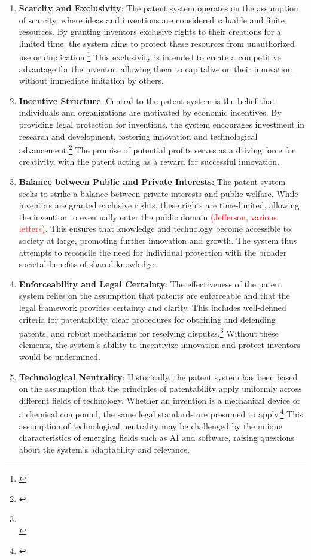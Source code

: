 \documentclass{article}[10pt]
\begin{document}
\begin{enumerate}
    \item \textbf{Scarcity and Exclusivity}: 
    The patent system operates on the assumption of scarcity, where ideas and inventions are considered valuable and finite resources. 
    By granting inventors exclusive rights to their creations for a limited time, the system aims to protect these resources from unauthorized use or duplication.\footnote{\cite{machlup1958economic}} 
    This exclusivity is intended to create a competitive advantage for the inventor, allowing them to capitalize on their innovation without immediate imitation by others.
    \item \textbf{Incentive Structure}: 
    Central to the patent system is the belief that individuals and organizations are motivated by economic incentives. 
    By providing legal protection for inventions, the system encourages investment in research and development, fostering innovation and technological advancement.\footnote{\cite{machlup1958economic}} 
    The promise of potential profits serves as a driving force for creativity, with the patent acting as a reward for successful innovation.
    \item \textbf{Balance between Public and Private Interests}: 
    The patent system seeks to strike a balance between private interests and public welfare. 
    While inventors are granted exclusive rights, these rights are time-limited, allowing the invention to eventually enter the public domain \textcolor{red}{(Jefferson, various letters)}. 
    This ensures that knowledge and technology become accessible to society at large, promoting further innovation and growth. 
    The system thus attempts to reconcile the need for individual protection with the broader societal benefits of shared knowledge.
    \item \textbf{Enforceability and Legal Certainty}: 
    The effectiveness of the patent system relies on the assumption that patents are enforceable and that the legal framework provides certainty and clarity. 
    This includes well-defined criteria for patentability, clear procedures for obtaining and defending patents, and robust mechanisms for resolving disputes.\footnote{
        \cite{1966graham}\\
        \indent\indent \cite{2007ksr}}
    Without these elements, the system's ability to incentivize innovation and protect inventors would be undermined.
    \item \textbf{Technological Neutrality}: 
    Historically, the patent system has been based on the assumption that the principles of patentability apply uniformly across different fields of technology. 
    Whether an invention is a mechanical device or a chemical compound, the same legal standards are presumed to apply.\footnote{\cite{1980diamond}}
    This assumption of technological neutrality may be challenged by the unique characteristics of emerging fields such as AI and software, raising questions about the system's adaptability and relevance.
\end{enumerate}
\end{document}
